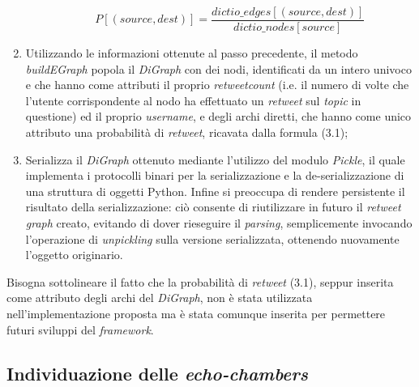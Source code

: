 \begin{enumerate}
\begin{itemize}
\begin{equation}
P[(source,dest)] = \frac{dictio\_edges[(source,dest)]}{dictio\_nodes[source]}
\end{equation}

\end{itemize}
\item Utilizzando le informazioni ottenute al passo precedente, il metodo \textit{buildEGraph} popola il \textit{DiGraph} con dei nodi, identificati da un intero univoco e che hanno come attributi il proprio \textit{retweetcount} (i.e. il numero di volte che l'utente corrispondente al nodo ha effettuato un \textit{retweet} sul \textit{topic} in questione) ed il proprio \textit{username}, e degli archi diretti, che hanno come unico attributo una probabilità di \textit{retweet}, ricavata dalla formula (3.1);

\item Serializza il \textit{DiGraph} ottenuto mediante l'utilizzo del modulo \textit{Pickle}, il quale implementa i protocolli binari per la serializzazione e la de-serializzazione di una struttura di oggetti Python. Infine si preoccupa di rendere persistente il risultato della serializzazione: ciò consente di riutilizzare in futuro il \textit{retweet graph} creato, evitando di dover rieseguire il \textit{parsing}, semplicemente invocando l'operazione di \textit{unpickling} sulla versione serializzata, ottenendo nuovamente l'oggetto originario.  
\end{enumerate}
Bisogna sottolineare il fatto che la probabilità di \textit{retweet} (3.1), seppur inserita come attributo degli archi del \textit{DiGraph}, non è stata utilizzata nell'implementazione proposta ma è stata comunque inserita per permettere futuri sviluppi del \textit{framework}.
\\
\subsection{Individuazione delle \textit{echo-chambers}}

